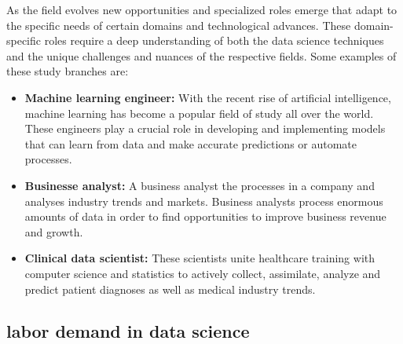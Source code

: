 \documentclass{vgtc}                          %
\begin{document}
As the field evolves new opportunities and specialized roles emerge that adapt to the specific needs of certain domains and technological advances. These domain-specific roles require 
a deep understanding of both the data science techniques and the unique challenges and nuances of the respective fields. Some examples of these study branches are:

\begin{itemize}
  \item \textbf{Machine learning engineer:} With the recent rise of artificial intelligence, machine learning has become a popular field of study all over the world. These engineers 
  play a crucial role in developing and implementing models that can learn from data and make accurate predictions or automate processes.
  \item \textbf{Businesse analyst:} A business analyst the processes in a company and analyses industry trends and markets. Business analysts process enormous amounts of data in order 
  to find opportunities to improve business revenue and growth.
  \item \textbf{Clinical data scientist:} These scientists unite healthcare training with computer science and statistics to actively collect, assimilate, analyze and predict patient 
  diagnoses as well as medical industry trends.
\end{itemize} 

\subsection{labor demand in data science}
\end{document}

